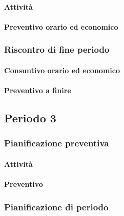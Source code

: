 
\paragraph{Attività}

\planningTable{
	
}


\paragraph{Preventivo orario ed economico}



\subsubsection{Riscontro di fine periodo}


\paragraph{Consuntivo orario ed economico}


\paragraph{Preventivo a finire}





\subsection{Periodo 3}

\subsubsection{Pianificazione preventiva}

\paragraph{Attività}

\planningTable{
	
}

\paragraph{Preventivo}


\subsubsection{Pianificazione di periodo}


